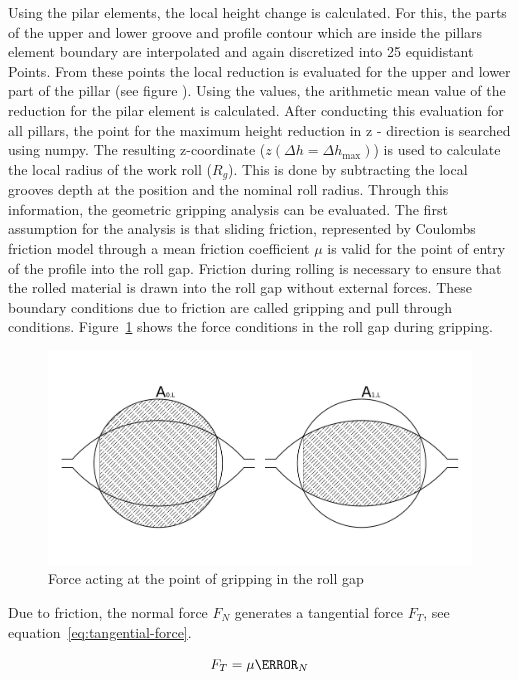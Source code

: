 \documentclass[11pt]{PyRollDocs}
\begin{document}
    Using the pilar elements, the local height change is calculated.
    For this, the  parts of the upper and lower groove and profile contour which are inside the pillars element boundary are interpolated and
    again discretized into 25 equidistant Points.
    From these points the local reduction is evaluated for the upper and lower part of the pillar (see figure ).
    Using the values, the arithmetic mean value of the reduction for the pilar element is calculated.
    After conducting this evaluation for all pillars, the point for the maximum height reduction in z - direction is searched using numpy.
    The resulting z-coordinate ($z(\Delta h = \Delta h_{\max})$) is used to calculate the local radius of the work roll ($R_{g}$).
    This is done by subtracting the local grooves depth at the position and the nominal roll radius.
    Through this information, the geometric gripping analysis can be evaluated.
    The first assumption for the analysis is that sliding friction,
    represented by Coulombs friction model through a mean friction coefficient $\mu$ is valid for the point of entry of the profile into the roll gap.
    Friction during rolling is necessary to ensure that the rolled material is drawn into the roll gap without external forces.
    These boundary conditions due to friction are called gripping and pull through conditions.
    Figure~\ref{fig:roll-gap-forces} shows the force conditions in the roll gap during gripping.

    \begin{figure}
        \centering
        \includegraphics[width=.7\linewidth]{img/overlapping-area}
        \caption{Force acting at the point of gripping in the roll gap}
        \label{fig:roll-gap-forces}
    \end{figure}

    Due to friction, the normal force $F_N$ generates a tangential force $F_T$, see equation~\ref{eq:tangential-force}.

    \begin{equation}
        F_T = \mu \F_N
        \label{eq:tangential-force}
    \end{equation}
\end{document}
